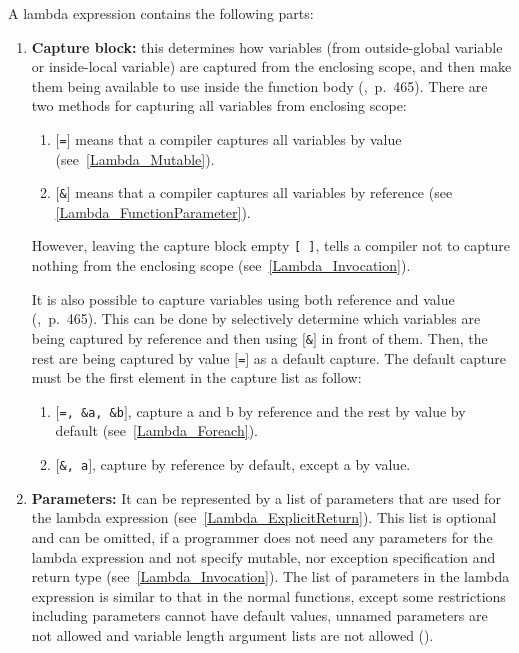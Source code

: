 \documentclass[11pt]{report}
\begin{document}
A lambda expression contains the following parts:
\begin{enumerate}
\item \textbf{Capture block:} this determines how variables (from outside-global variable or inside-local variable) are captured from the enclosing scope, and then make them being available to use inside the function body (\cite{Gregorie:professionalcpp},~p.~465). There are two methods for capturing all variables from enclosing scope:

      \begin{enumerate}
      \item \texttt{$[$=$]$} means that a compiler captures all variables by value (see~\ref{Lambda_Mutable}).
      \item \texttt{$[$\&$]$} means that a compiler captures all variables by reference (see~     \ref{Lambda_FunctionParameter}).
      \end{enumerate}
      However, leaving the capture block empty \texttt{[~]}, tells a compiler not to capture nothing from the enclosing scope (see~\ref{Lambda_Invocation}).
      
It is also possible to capture variables using both reference and value (\cite{Gregorie:professionalcpp},~p.~465). This can be done by selectively determine which variables are being captured by reference and then using \texttt{$[$\&$]$} in front of them. Then, the rest are being captured by value \texttt{$[$=$]$} as a default capture. The default capture must be the first element in the capture list as follow:
      \begin{enumerate}
      \item \texttt{$[$=,~\&a,~\&b$]$}, capture a and b by reference and the rest by value by default (see~\ref{Lambda_Foreach}).
      \item \texttt{$[$\&,~a$]$}, capture by reference by default, except a by value.
      \end{enumerate}
      
      
\item \textbf{Parameters:} It can be represented by a list of parameters that are used for the lambda expression (see~\ref{Lambda_ExplicitReturn}). This list is optional and can be omitted, if a programmer does not need any parameters for the lambda expression and not specify mutable, nor exception specification and return type (see~\ref{Lambda_Invocation}). The list of parameters in the lambda expression is similar to that in the normal functions, except some restrictions including parameters cannot have default values, unnamed parameters are not allowed and variable length argument lists are not allowed (\cite{Cppreference:2012:Cpp11}).


\end{enumerate}
\end{document}
